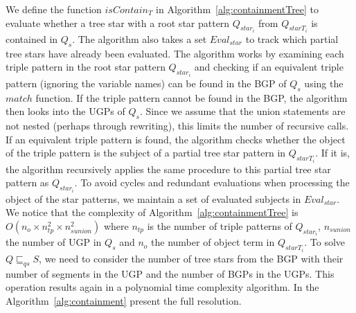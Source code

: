 We define the function $isContain_{T}$ in Algorithm~\ref{alg:containmentTree} to evaluate whether a tree star with a root star pattern $Q_{star_i}$ from $Q_{starT_i}$ is contained in $Q_s$. 
The algorithm also takes a set $Eval_{star}$ to track which partial tree stars have already been evaluated.
The algorithm works by examining each triple pattern in the root star pattern $Q_{star_i}$ and checking if an equivalent triple pattern (ignoring the variable names) can be found in the BGP of $Q_s$ using the $match$ function.
If the triple pattern cannot be found in the BGP, the algorithm then looks into the UGPs of $Q_s$. 
Since we assume that the union statements are not nested (perhaps through rewriting), this limits the number of recursive calls.
If an equivalent triple pattern is found, the algorithm checks whether the object of the triple pattern is the subject of a partial tree star pattern in $Q_{starT_i}$.
If it is, the algorithm recursively applies the same procedure to this partial tree star pattern as $Q_{star_i}$.
To avoid cycles and redundant evaluations when processing the object of the star patterns, we maintain a set of evaluated subjects in $Eval_{star}$.
We notice that the complexity of Algorithm~\ref{alg:containmentTree} is $O( n_o \times n_{tp}^2 \times n_{sunion}^2)$
where $n_{tp}$ is the number of triple patterns of $Q_{star_i}$, $n_{sunion}$ the number of UGP in $Q_s$ and $n_o$ the number of object term in $Q_{starT_i}$.
To solve $Q \sqsubseteq_{qs} S$, we need to consider the number of tree stars from the BGP with their number of segments in the UGP and the number of BGPs in the UGPs.
This operation results again in a polynomial time complexity algorithm.
In the  Algorithm~\ref{alg:containment} present the full resolution.
